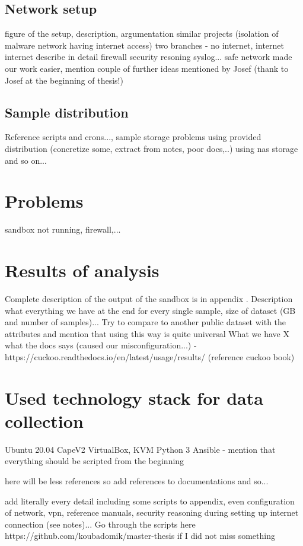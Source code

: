 \subsection{Network setup}
figure of the setup, description, argumentation
similar projects (isolation of malware network having internet access)
two branches - no internet, internet
internet
    describe in detail
    firewall
    security resoning
    syslog...
safe network made our work easier, mention couple of further ideas mentioned by Josef (thank to Josef at the beginning of thesis!)
\subsection{Sample distribution}
Reference scripts and crons..., sample storage
problems using provided distribution (concretize some, extract from notes, poor docs,..)
using nas storage and so on...

\section{Problems}
sandbox not running, firewall,...

\section{Results of analysis}
Complete description of the output of the sandbox is in appendix .
Description what everything we have at the end for every single sample, size of dataset (GB and number of samples)...
Try to compare to another public dataset with the attributes and mention that using this way is quite universal
What we have X what the docs says (caused our misconfiguration...) - https://cuckoo.readthedocs.io/en/latest/usage/results/ (reference cuckoo book)

\section{Used technology stack for data collection}
Ubuntu 20.04
CapeV2
VirtualBox, KVM
Python 3
Ansible - mention that everything should be scripted from the beginning



here will be less references so add references to documentations and so...

add literally every detail including some scripts to appendix, even configuration of network, vpn, reference manuals, security reasoning during setting up internet connection (see notes)...
Go through the scripts here https://github.com/koubadomik/master-thesis if I did not miss something

